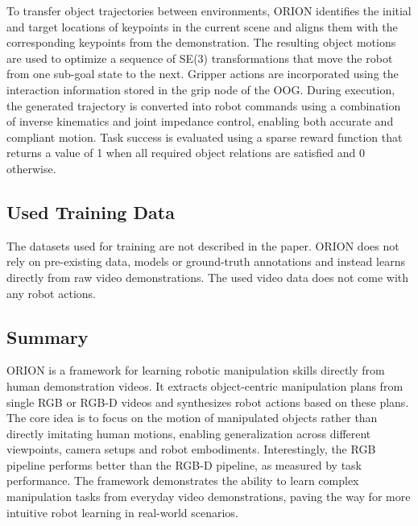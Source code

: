 To transfer object trajectories between environments, ORION identifies the initial and target locations of keypoints in the current scene and aligns them with the corresponding keypoints from the demonstration. The resulting object motions are used to optimize a sequence of SE(3) transformations that move the robot from one sub-goal state to the next. Gripper actions are incorporated using the interaction information stored in the grip node of the \ac{OOG}. During execution, the generated trajectory is converted into robot commands using a combination of inverse kinematics and joint impedance control, enabling both accurate and compliant motion. Task success is evaluated using a sparse reward function that returns a value of 1 when all required object relations are satisfied and 0 otherwise.

\subsection{Used Training Data}
The datasets used for training are not described in the paper. 
ORION does not rely on pre-existing data, models or ground-truth annotations and instead learns directly from raw video demonstrations. The used video data does not come with any robot actions. 

\subsection{Summary}
ORION is a framework for learning robotic manipulation skills directly from human demonstration videos. It extracts object-centric manipulation plans from single RGB or RGB-D videos and synthesizes robot actions based on these plans. The core idea is to focus on the motion of manipulated objects rather than directly imitating human motions, enabling generalization across different viewpoints, camera setups and robot embodiments. Interestingly, the RGB pipeline performs better than the RGB-D pipeline, as measured by task performance. The framework demonstrates the ability to learn complex manipulation tasks from everyday video demonstrations, paving the way for more intuitive robot learning in real-world scenarios.

